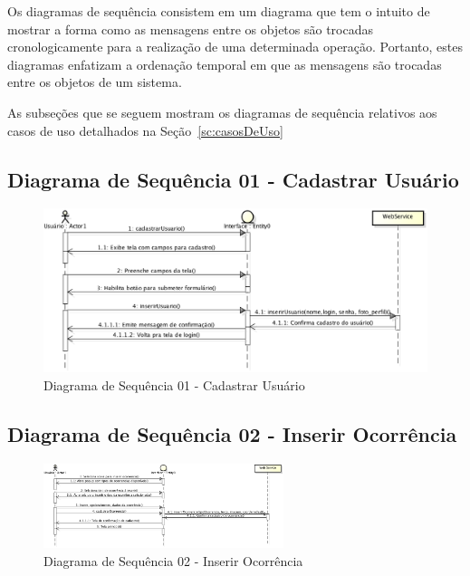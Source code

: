 Os diagramas de sequ\^{e}ncia consistem em um diagrama que tem o intuito de mostrar a forma como as mensagens entre os objetos s\~{a}o trocadas cronologicamente para a realiza\c{c}\~{a}o de uma determinada opera\c{c}\~{a}o. Portanto, estes diagramas enfatizam a ordena\c{c}\~{a}o temporal em que as mensagens s\~{a}o trocadas entre os objetos de um sistema.

As subse\c{c}\~{o}es que se seguem mostram os diagramas de sequ\^{e}ncia relativos aos casos de uso detalhados na Se\c{c}\~{a}o~\ref{sc:casosDeUso}

\subsection{Diagrama de Sequência 01 - Cadastrar Usuário}
\begin{figure}[!h]
\begin{center}
  \includegraphics[width=17cm]{images/Diagramas/Diagram_de_Sequencia-Cadastrar_Usuario.png}
  \caption{Diagrama de Sequ\^{e}ncia 01 - Cadastrar Usu\'{a}rio}
  \label{fig:diagramaSequenciaCadastroUsuario}
\end{center}
\end{figure}

\subsection{Diagrama de Sequência 02 - Inserir Ocorrência}
\begin{figure}[!h]
\begin{center}
  \includegraphics[width=7cm]{images/Diagramas/Diagram_de_Sequencia-Inserir_Ocorrencia.png}
  \caption{Diagrama de Sequ\^{e}ncia 02 - Inserir Ocorr\^{e}ncia}
  \label{fig:diagramaSequenciaInserirOcorrencia}
\end{center}
\end{figure}

